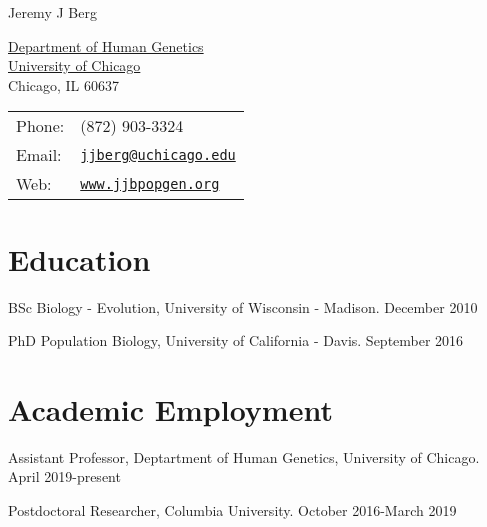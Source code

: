 \documentclass[letterpaper]{article}
\def\name{Jeremy J Berg}
\renewenvironment{itemize}{
  \begin{list}{}{
    \setlength{\leftmargin}{1.5em}
  }
}{
  \end{list}
}
\begin{document}
{\huge \name}


\vspace{0.25in}

\begin{minipage}{0.45\linewidth}
  \href{https://genes.uchicago.edu/}{Department of Human Genetics} \\
  \href{https://www.uchicago.edu/}{University of Chicago} \\
  Chicago, IL 60637
\end{minipage}
\begin{minipage}{0.45\linewidth}
  \begin{tabular}{ll}
    Phone: & (872) 903-3324 \\
    Email: & \href{jjberg@uchicago.edu}{\tt jjberg@uchicago.edu} \\
    Web: & \href{http://www.jjbpopgen.org}{\tt www.jjbpopgen.org} \\
  \end{tabular}
\end{minipage}

\section*{Education}
\begin{itemize}
 \item BSc Biology - Evolution, University of Wisconsin - Madison.  December 2010
 \item PhD Population Biology, University of California - Davis.  September 2016
 \end{itemize}

\section*{Academic Employment}
\begin{itemize}
%
\item Assistant Professor, Deptartment of Human Genetics, University of Chicago. April 2019-present
\item Postdoctoral Researcher, Columbia University. October 2016-March 2019
%
\end{itemize}
\end{document}
